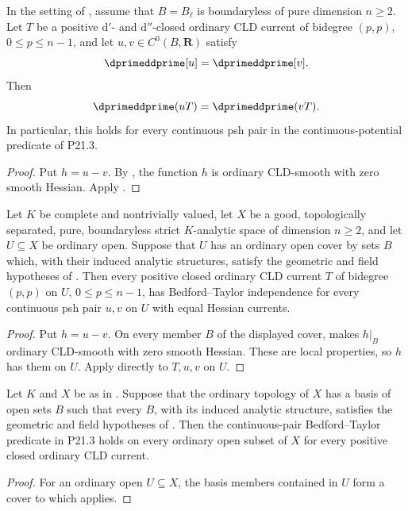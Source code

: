 \begin{corollary}
\label{cor:p213-endpoint-mixed-tower-bt}
In the setting of
, assume that
\(B=B_\ell\) is boundaryless of pure dimension \(n\geq2\).  Let \(T\) be a
positive \(\mathrm d'\)- and \(\mathrm d''\)-closed ordinary CLD current of
bidegree \((p,p)\), \(0\leq p\leq n-1\), and let
\(u,v\in C^0(B,\mathbf R)\) satisfy
\[
                         \dprimeddprime[u]=\dprimeddprime[v].
\]
Then
\[
                         \dprimeddprime(uT)=\dprimeddprime(vT).
\]
In particular, this holds for every continuous psh pair in the
continuous-potential predicate of P21.3.
\end{corollary}

\begin{proof}
Put \(h=u-v\).  By
, the function \(h\) is
ordinary CLD-smooth with zero smooth Hessian.  Apply
.
\end{proof}

\begin{corollary}
\label{cor:p213-endpoint-mixed-tower-cover-bt}
Let \(K\) be complete and nontrivially valued, let \(X\) be a good,
topologically separated, pure, boundaryless strict \(K\)-analytic space of
dimension \(n\geq2\), and let \(U\subseteq X\) be ordinary open.  Suppose
that \(U\) has an ordinary open cover by sets \(B\) which, with their induced
analytic structures, satisfy the geometric and field hypotheses of
.  Then every positive closed
ordinary CLD current \(T\) of bidegree \((p,p)\) on \(U\),
\(0\leq p\leq n-1\), has Bedford--Taylor independence for every continuous
psh pair \(u,v\) on \(U\) with equal Hessian currents.
\end{corollary}

\begin{proof}
Put \(h=u-v\).  On every member \(B\) of the displayed cover,
 makes \(h|_B\) ordinary
CLD-smooth with zero smooth Hessian.  These are local properties, so \(h\)
has them on \(U\).  Apply  directly to \(T,u,v\) on
\(U\).
\end{proof}

\begin{corollary}
\label{cor:p213-endpoint-mixed-tower-basis-bt}
Let \(K\) and \(X\) be as in
.  Suppose that the ordinary
topology of \(X\) has a basis of open sets \(B\) such that every \(B\), with
its induced analytic structure, satisfies the geometric and field hypotheses
of .  Then the continuous-pair
Bedford--Taylor predicate in P21.3 holds on every ordinary open subset of
\(X\) for every positive closed ordinary CLD current.
\end{corollary}

\begin{proof}
For an ordinary open \(U\subseteq X\), the basis members contained in \(U\)
form a cover to which
 applies.
\end{proof}
